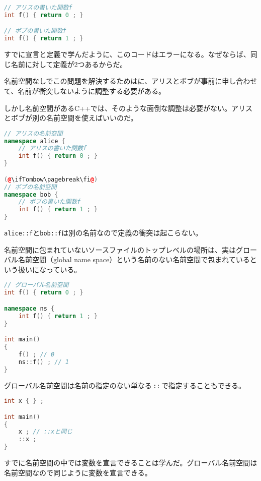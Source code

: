 \begin{lstlisting}[language={C++}]
// アリスの書いた関数f
int f() { return 0 ; }

// ボブの書いた関数f
int f() { return 1 ; }
\end{lstlisting}

すでに宣言と定義で学んだように、このコードはエラーになる。なぜならば、同じ名前に対して定義が2つあるからだ。

名前空間なしでこの問題を解決するためはに、アリスとボブが事前に申し合わせて、名前が衝突しないように調整する必要がある。

しかし名前空間があるC++では、そのような面倒な調整は必要がない。アリスとボブが別の名前空間を使えばいいのだ。

\begin{lstlisting}[language={C++}]
// アリスの名前空間
namespace alice {
    // アリスの書いた関数f
    int f() { return 0 ; }
}

(@\ifTombow\pagebreak\fi@)
// ボブの名前空間
namespace bob {
    // ボブの書いた関数f
    int f() { return 1 ; }
}
\end{lstlisting}

\texttt{alice::f}と\texttt{bob::f}は別の名前なので定義の衝突は起こらない。


名前空間に包まれていないソースファイルのトップレベルの場所は、実はグローバル名前空間（global name space）という名前のない名前空間で包まれているという扱いになっている。

\begin{lstlisting}[language={C++}]
// グローバル名前空間
int f() { return 0 ; }

namespace ns {
    int f() { return 1 ; }
}

int main()
{
    f() ; // 0
    ns::f() ; // 1
}
\end{lstlisting}

グローバル名前空間は名前の指定のない単なる\,\texttt{::}\,で指定することもできる。

\begin{lstlisting}[language={C++}]
int x { } ;

int main()
{
    x ; // ::xと同じ
    ::x ;
}
\end{lstlisting}

すでに名前空間の中では変数を宣言できることは学んだ。グローバル名前空間は名前空間なので同じように変数を宣言できる。

